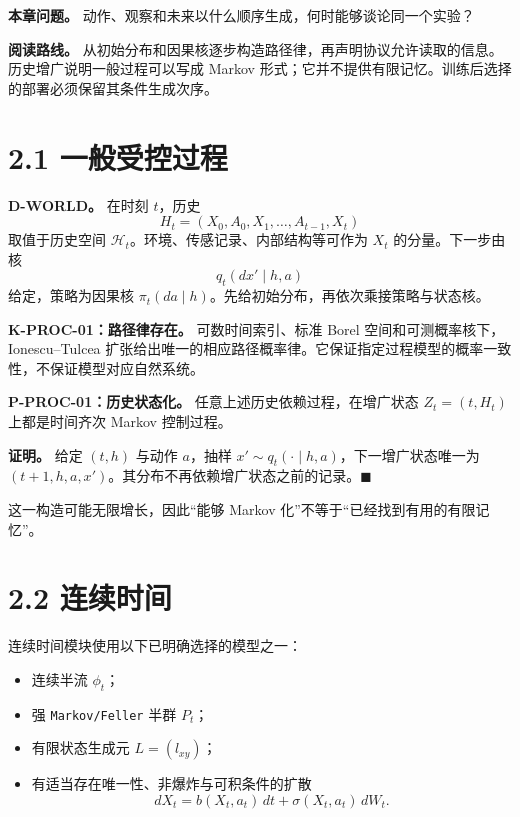\documentclass[
  11pt,
  oneside]{book}
\providecommand{\tightlist}{%
  \setlength{\itemsep}{0pt}\setlength{\parskip}{0pt}}
\begin{document}
\textbf{本章问题。} 动作、观察和未来以什么顺序生成，何时能够谈论同一个实验？

\textbf{阅读路线。} 从初始分布和因果核逐步构造路径律，再声明协议允许读取的信息。历史增广说明一般过程可以写成 Markov 形式；它并不提供有限记忆。训练后选择的部署必须保留其条件生成次序。

\section{2.1 一般受控过程}\label{ux4e00ux822cux53d7ux63a7ux8fc7ux7a0b}

\textbf{D-WORLD。} 在时刻 \(t\)，历史 \[H_t=(X_0,A_0,X_1,\ldots,A_{t-1},X_t)\] 取值于历史空间 \(\mathcal H_t\)。环境、传感记录、内部结构等可作为 \(X_t\) 的分量。下一步由核 \[q_t(dx'\mid h,a)\] 给定，策略为因果核 \(\pi_t(da\mid h)\)。先给初始分布，再依次乘接策略与状态核。

\textbf{K-PROC-01：路径律存在。} 可数时间索引、标准 Borel 空间和可测概率核下，Ionescu--Tulcea 扩张给出唯一的相应路径概率律。它保证指定过程模型的概率一致性，不保证模型对应自然系统。

\hypertarget{p-proc-01}{}\label{p-proc-01}

\textbf{P-PROC-01：历史状态化。} 任意上述历史依赖过程，在增广状态 \(Z_t=(t,H_t)\) 上都是时间齐次 Markov 控制过程。

\textbf{证明。} 给定 \((t,h)\) 与动作 \(a\)，抽样 \(x'\sim q_t(\cdot\mid h,a)\)，下一增广状态唯一为 \((t+1,h,a,x')\)。其分布不再依赖增广状态之前的记录。\(\blacksquare\)

这一构造可能无限增长，因此``能够 Markov 化''不等于``已经找到有用的有限记忆''。

\section{2.2 连续时间}\label{ux8fdeux7eedux65f6ux95f4}

连续时间模块使用以下已明确选择的模型之一：

\begin{itemize}
\tightlist
\item
  连续半流 \(\phi_t\)；
\item
  强 \nolinkurl{Markov/Feller} 半群 \(P_t\)；
\item
  有限状态生成元 \(L=(l_{xy})\)；
\item
  有适当存在唯一性、非爆炸与可积条件的扩散 \[dX_t=b(X_t,a_t)\,dt+\sigma(X_t,a_t)\,dW_t.\]
\end{itemize}
\end{document}
